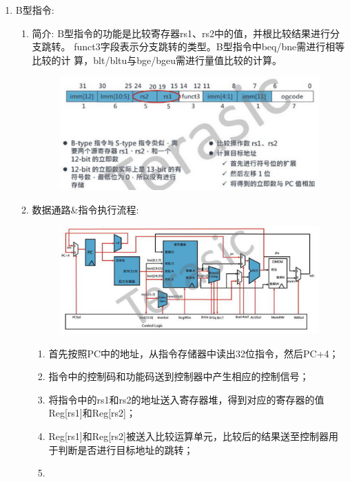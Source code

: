 \documentclass[a4paper, 14pt, oneside]{book} %
\numberwithin{equation}{subsection}
\begin{document}
\begin{enumerate}
				\item{B型指令:}
					\begin{enumerate}
						\item{简介:}
							\subitem
								B型指令的功能是比较寄存器rs1、rs2中的值，并根比较结果进行分支跳转。
								funct3字段表示分支跳转的类型。B型指令中beq/bne需进行相等比较的计
								算，blt/bltu与bge/bgeu需进行量值比较的计算。
								\begin{figure}[H]
									\centering
									\includegraphics[scale=0.5]{img/b1.png}
								\end{figure}
						\item{数据通路\&指令执行流程:}
							\begin{figure}[H]
								\centering
								\includegraphics[scale=0.5]{img/b2.png}
							\end{figure}
							\begin{enumerate}
								\item
									首先按照PC中的地址，从指令存储器中读出32位指令，然后PC+4；
								\item
									指令中的控制码和功能码送到控制器中产生相应的控制信号；
								\item
									将指令中的rs1和rs2的地址送入寄存器堆，得到对应的寄存器的值Reg[rs1]和Reg[rs2]；
								\item
									Reg[rs1]和Reg[rs2]被送入比较运算单元，比较后的结果送至控制器用于判断是否进行目标地址的跳转；
								\item

\end{enumerate}
\end{enumerate}
\end{enumerate}
\end{document}
